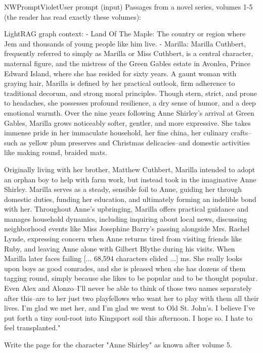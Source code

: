 \begin{nwprompt}{NWPromptViolet}{User prompt (input)}
Passages from a novel series, volumes 1-5 (the reader has read exactly these volumes):

LightRAG graph context:
- Land Of The Maple: The country or region where Jem and thousands of young people like him live.
- Marilla: Marilla Cuthbert, frequently referred to simply as Marilla or Miss Cuthbert, is a central character, maternal figure, and the mistress of the Green Gables estate in Avonlea, Prince Edward Island, where she has resided for sixty years. A gaunt woman with graying hair, Marilla is defined by her practical outlook, firm adherence to traditional decorum, and strong moral principles. Though stern, strict, and prone to headaches, she possesses profound resilience, a dry sense of humor, and a deep emotional warmth. Over the nine years following Anne Shirley's arrival at Green Gables, Marilla grows noticeably softer, gentler, and more expressive. She takes immense pride in her immaculate household, her fine china, her culinary crafts--such as yellow plum preserves and Christmas delicacies--and domestic activities like making round, braided mats.

Originally living with her brother, Matthew Cuthbert, Marilla intended to adopt an orphan boy to help with farm work, but instead took in the imaginative Anne Shirley. Marilla serves as a steady, sensible foil to Anne, guiding her through domestic duties, funding her education, and ultimately forming an indelible bond with her. Throughout Anne's upbringing, Marilla offers practical guidance and manages household dynamics, including inquiring about local news, discussing neighborhood events like Miss Josephine Barry's passing alongside Mrs. Rachel Lynde, expressing concern when Anne returns tired from visiting friends like Ruby, and leaving Anne alone with Gilbert Blythe during his visits. When Marilla later faces failing 
[... 68,594 characters elided ...]
ms. She really looks upon boys as good comrades, and she is pleased when she has dozens of them tagging round, simply because she likes to be popular and to be thought popular. Even Alex and Alonzo--I'll never be able to think of those two names separately after this--are to her just two playfellows who want her to play with them all their lives. I'm glad we met her, and I'm glad we went to Old St. John's. I believe I've put forth a tiny soul-root into Kingsport soil this afternoon. I hope so. I hate to feel transplanted."

Write the page for the character "Anne Shirley" as known after volume 5.
\end{nwprompt}

